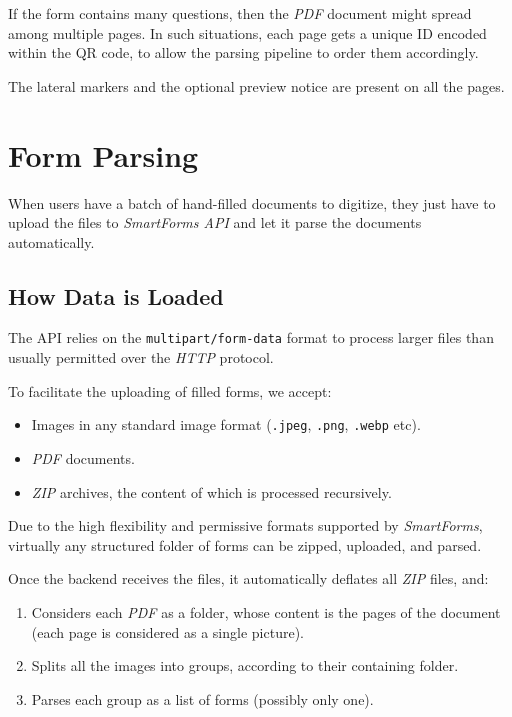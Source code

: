 \documentclass[11pt, a4paper]{report}
\def\code#1{\texttt{#1}}
\begin{document}
If the form contains many questions, then the \textit{PDF} document might spread among multiple pages. In such situations, each page gets a unique ID encoded within the QR code, to allow the parsing pipeline to order them accordingly.

The lateral markers and the optional preview notice are present on all the pages.



\chapter{Form Parsing}
\label{chapter-form-parsing}

When users have a batch of hand-filled documents to digitize, they just have to upload the files to \textit{SmartForms API} and let it parse the documents automatically.

\section{How Data is Loaded}

The API relies on the \code{multipart/form-data} \cite{masinter1998rfc2388} format to process larger files than usually permitted over the \textit{HTTP} protocol.

To facilitate the uploading of filled forms, we accept:
\begin{itemize}
    \item Images in any standard image format (\code{.jpeg}, \code{.png}, \code{.webp} etc).
    \item \textit{PDF} documents.
    \item \textit{ZIP} archives, the content of which is processed recursively.
\end{itemize}

Due to the high flexibility and permissive formats supported by \textit{SmartForms}, virtually any structured folder of forms can be zipped, uploaded, and parsed.

Once the backend receives the files, it automatically deflates all \textit{ZIP} files, and:
\begin{enumerate}
    \item Considers each \textit{PDF} as a folder, whose content is the pages of the document (each page is considered as a single picture).
    \item Splits all the images into groups, according to their containing folder.
    \item Parses each group as a list of forms (possibly only one).
\end{enumerate}
\end{document}

